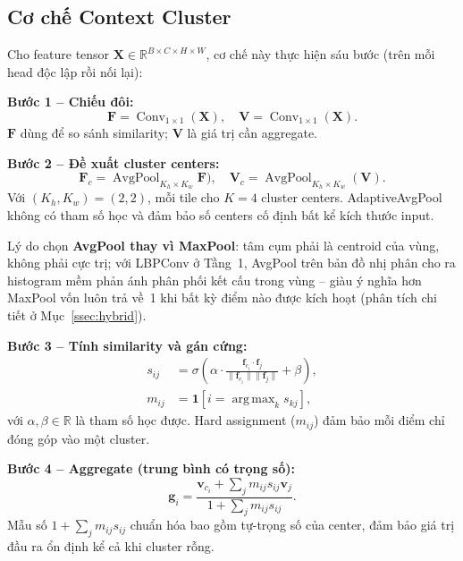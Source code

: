 \documentclass[conference]{IEEEtran}
\begin{document}
\subsection{Cơ chế Context Cluster}
\label{ssec:coc}

Cho feature tensor $\mathbf{X}\in\mathbb{R}^{B\times C\times H\times W}$,
cơ chế này thực hiện sáu bước (trên mỗi head độc lập rồi nối
lại):

\noindent\textbf{Bước 1 -- Chiếu đôi:}
\begin{equation}
  \mathbf{F}=\operatorname{Conv}_{1\times1}(\mathbf{X}),\quad
  \mathbf{V}=\operatorname{Conv}_{1\times1}(\mathbf{X}).
  \label{eq:proj}
\end{equation}
$\mathbf{F}$ dùng để so sánh similarity; $\mathbf{V}$ là giá trị cần
aggregate.

\noindent\textbf{Bước 2 -- Đề xuất cluster centers:}
\begin{equation}
  \mathbf{F}_c = \operatorname{AvgPool}_{K_h\times K_w} \mathbf{F}),\quad \mathbf{V}_c = \operatorname{AvgPool}_{K_h\times K_w}(\mathbf{V}).
  \label{eq:centers}
\end{equation}
Với $(K_h,K_w){=}(2,2)$, mỗi tile cho $K{=}4$ cluster centers.
AdaptiveAvgPool không có tham số học và đảm bảo số centers cố định
bất kể kích thước input.

Lý do chọn \textbf{AvgPool thay vì MaxPool}: tâm cụm phải là
centroid của vùng, không phải cực trị; với LBPConv ở Tầng~1, AvgPool
trên bản đồ nhị phân cho ra histogram mềm phản ánh phân phối kết cấu
trong vùng -- giàu ý nghĩa hơn MaxPool vốn luôn trả về~1 khi bất kỳ
điểm nào được kích hoạt (phân tích chi tiết ở Mục~\ref{ssec:hybrid}).

\noindent\textbf{Bước 3 -- Tính similarity và gán cứng:}
\begin{align}
  s_{ij} &= \sigma\!\left(\alpha\cdot
    \frac{\mathbf{f}_{c_i}\cdot\mathbf{f}_j}
         {\|\mathbf{f}_{c_i}\|\|\mathbf{f}_j\|}+\beta\right),
  \label{eq:sim}\\
  m_{ij} &= \mathbf{1}\!\left[i=\operatorname{arg\,max}_{k}s_{kj}\right],
  \label{eq:mask}
\end{align}
với $\alpha,\beta\in\mathbb{R}$ là tham số học được. Hard assignment
($m_{ij}$) đảm bảo mỗi điểm chỉ đóng góp vào một cluster.

\noindent\textbf{Bước 4 -- Aggregate (trung bình có trọng số):}
\begin{equation}
  \mathbf{g}_i = \frac{\mathbf{v}_{c_i}+\displaystyle\sum_j m_{ij}s_{ij}\mathbf{v}_j} {1+\displaystyle\sum_j m_{ij}s_{ij}}.
  \label{eq:aggregate}
\end{equation}
Mẫu số $1+\displaystyle\sum_j m_{ij}s_{ij}$ chuẩn hóa bao gồm tự-trọng số của center, đảm bảo giá trị đầu ra ổn định kể cả khi cluster rỗng.
\end{document}
